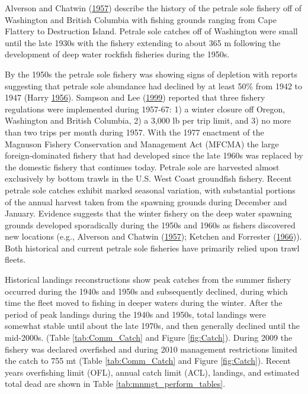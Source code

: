 \documentclass[12pt,]{article}
\begin{document}
Alverson and Chatwin
(\protect\hyperlink{ref-alverson_results_1957}{1957}) describe the
history of the petrale sole fishery off of Washington and British
Columbia with fishing grounds ranging from Cape Flattery to Destruction
Island. Petrale sole catches off of Washington were small until the late
1930s with the fishery extending to about 365 m following the
development of deep water rockfish fisheries during the 1950s.

By the 1950s the petrale sole fishery was showing signs of depletion
with reports suggesting that petrale sole abundance had declined by at
least 50\% from 1942 to 1947 (Harry
\protect\hyperlink{ref-harry_analysis_1956}{1956}). Sampson and Lee
(\protect\hyperlink{ref-sampson_assessment_1999}{1999}) reported that
three fishery regulations were implemented during 1957-67: 1) a winter
closure off Oregon, Washington and British Columbia, 2) a 3,000 lb per
trip limit, and 3) no more than two trips per month during 1957. With
the 1977 enactment of the Magnuson Fishery Conservation and Management
Act (MFCMA) the large foreign-dominated fishery that had developed since
the late 1960s was replaced by the domestic fishery that continues
today. Petrale sole are harvested almost exclusively by bottom trawls in
the U.S. West Coast groundfish fishery. Recent petrale sole catches
exhibit marked seasonal variation, with substantial portions of the
annual harvest taken from the spawning grounds during December and
January. Evidence suggests that the winter fishery on the deep water
spawning grounds developed sporadically during the 1950s and 1960s as
fishers discovered new locations (e.g., Alverson and Chatwin
(\protect\hyperlink{ref-alverson_results_1957}{1957}); Ketchen and
Forrester (\protect\hyperlink{ref-ketchen_population_1966}{1966})). Both
historical and current petrale sole fisheries have primarily relied upon
trawl fleets.

Historical landings reconstructions show peak catches from the summer
fishery occurred during the 1940s and 1950s and subsequently declined,
during which time the fleet moved to fishing in deeper waters during the
winter. After the period of peak landings during the 1940s and 1950s,
total landings were somewhat stable until about the late 1970s, and then
generally declined until the mid-2000s. (Table \ref{tab:Comm_Catch} and
Figure \ref{fig:Catch}). During 2009 the fishery was declared overfished
and during 2010 management restrictions limited the catch to 755 mt
(Table \ref{tab:Comm_Catch} and Figure \ref{fig:Catch}). Recent years
overfishing limit (OFL), annual catch limit (ACL), landings, and
estimated total dead are shown in Table \ref{tab:mnmgt_perform_tables}.
\end{document}
